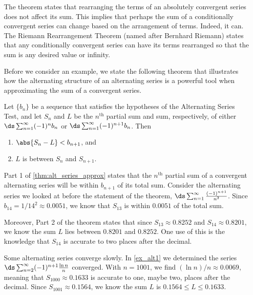 The theorem states that rearranging the terms of an absolutely convergent series does not affect its sum. This implies that perhaps the sum of a conditionally convergent series can change based on the arrangement of terms. Indeed, it can. The Riemann Rearrangement Theorem (named after Bernhard Riemann) states that any conditionally convergent series can have its terms rearranged so that the sum is any desired value or infinity.

Before we consider an example, we state the following theorem that illustrates how the alternating structure of an alternating series is a powerful tool when approximating the sum of a convergent series.

\begin{theorem}\label{thm:alt_series_approx}
Let $\{b_n\}$ be a sequence that satisfies the hypotheses of the Alternating Series Test, and let $S_n$ and $L$ be the $n^\text{th}$ partial sum and sum, respectively, of either $\ds \sum_{n=1}^\infty (-1)^{n}b_n$ or $\ds \sum_{n=1}^\infty (-1)^{n+1}b_n$. Then
\begin{enumerate}
	\item $\abs{S_n-L} < b_{n+1}$, and
	\item	$L$ is between $S_n$ and $S_{n+1}$.
\end{enumerate}
\end{theorem}

Part 1 of \autoref{thm:alt_series_approx} states that the $n^\text{th}$ partial sum of a convergent alternating series will be within $b_{n+1}$ of its total sum. Consider the alternating series we looked at before the statement of the theorem, $\ds \sum_{n=1}^\infty \frac{(-1)^{n+1}}{n^2}$. Since $b_{14} = 1/14^2 \approx 0.0051$, we know that $S_{13}$ is within $0.0051$ of the total sum. 

Moreover, Part 2 of the theorem states that since $S_{13} \approx 0.8252$ and $S_{14}\approx 0.8201$, we know the sum $L$ lies between $0.8201$ and $0.8252$. One use of this is the knowledge that $S_{14}$ is accurate to two places after the decimal.

Some alternating series converge slowly. In \autoref{ex_alt1} we determined the series $\ds\sum_{n=2}^\infty (-1)^{n+1}\frac{\ln n}{n}$ converged. With $n=1001$, we find $(\ln n)/n \approx 0.0069$, meaning that $S_{1000} \approx 0.1633$ is accurate to one, maybe two, places after the decimal. Since $S_{1001} \approx 0.1564$, we know the sum $L$ is $0.1564\leq L\leq0.1633$.

